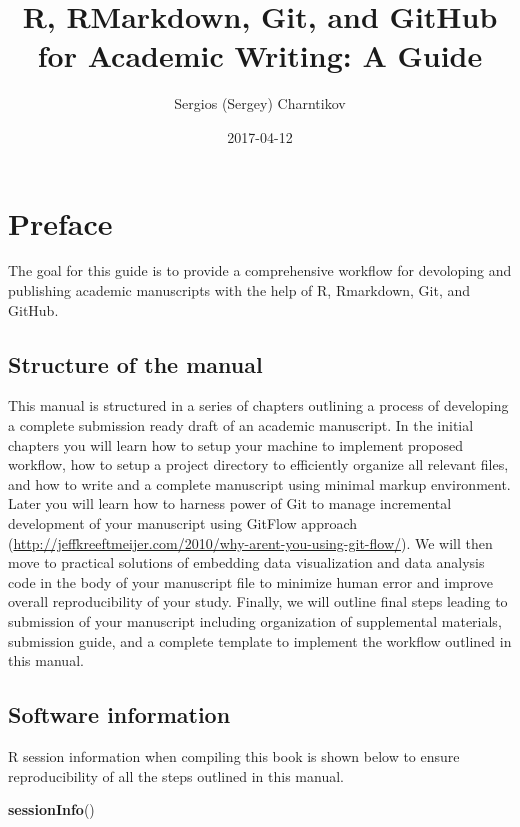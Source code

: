 \documentclass[]{book}
\title{R, RMarkdown, Git, and GitHub for Academic Writing: A Guide}
\author{Sergios (Sergey) Charntikov}
\date{2017-04-12}
\newenvironment{Shaded}{\begin{snugshade}}{\end{snugshade}}
\newcommand{\KeywordTok}[1]{\textcolor[rgb]{0.13,0.29,0.53}{\textbf{{#1}}}}
\newcommand{\NormalTok}[1]{{#1}}
\begin{document}
\maketitle

{
\setcounter{tocdepth}{1}
\tableofcontents
}
\chapter{Preface}\label{preface}

The goal for this guide is to provide a comprehensive workflow for
devoloping and publishing academic manuscripts with the help of R,
Rmarkdown, Git, and GitHub.

\section{Structure of the manual}\label{structure-of-the-manual}

This manual is structured in a series of chapters outlining a process of
developing a complete submission ready draft of an academic manuscript.
In the initial chapters you will learn how to setup your machine to
implement proposed workflow, how to setup a project directory to
efficiently organize all relevant files, and how to write and a complete
manuscript using minimal markup environment. Later you will learn how to
harness power of Git to manage incremental development of your
manuscript using GitFlow approach
(\url{http://jeffkreeftmeijer.com/2010/why-arent-you-using-git-flow/}).
We will then move to practical solutions of embedding data visualization
and data analysis code in the body of your manuscript file to minimize
human error and improve overall reproducibility of your study. Finally,
we will outline final steps leading to submission of your manuscript
including organization of supplemental materials, submission guide, and
a complete template to implement the workflow outlined in this manual.

\section{Software information}\label{software-information}

R session information when compiling this book is shown below to ensure
reproducibility of all the steps outlined in this manual.

\begin{Shaded}
\begin{Highlighting}[]
\KeywordTok{sessionInfo}\NormalTok{()}
\end{Highlighting}
\end{Shaded}
\end{document}
